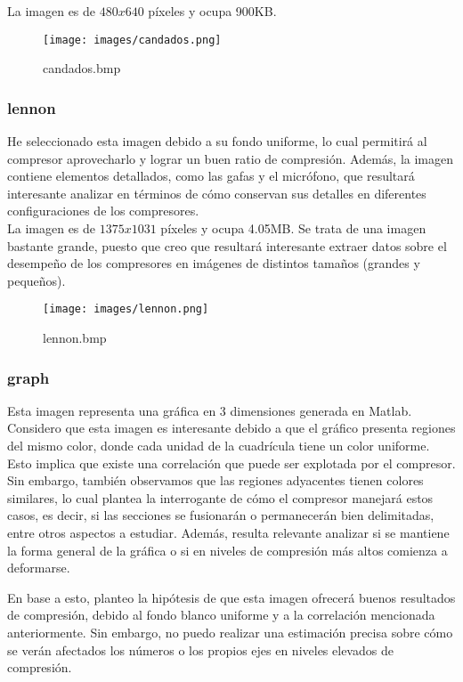\documentclass[12pt,a4paper]{article}
\begin{document}
La imagen es de $480x640$ píxeles y ocupa 900KB.\\

\begin{figure}[H]
    \centering
    \texttt{[image: images/candados.png]}
    \caption{candados.bmp}
    
\end{figure}

\subsubsection{lennon}
He seleccionado esta imagen debido a su fondo uniforme, lo cual permitirá al compresor aprovecharlo y lograr un buen ratio de compresión. Además, la imagen contiene elementos detallados, como las gafas y el micrófono, que resultará interesante analizar en términos de cómo conservan sus detalles en diferentes configuraciones de los compresores.\\

La imagen es de $1375x1031$ píxeles y ocupa 4.05MB. Se trata de una imagen bastante grande, puesto que creo que resultará interesante extraer datos sobre el desempeño de los compresores en imágenes de distintos tamaños (grandes y pequeños).\\

\begin{figure}[H]
    \centering
    \texttt{[image: images/lennon.png]}
    \caption{lennon.bmp}
    
\end{figure}

\subsubsection{graph}
Esta imagen representa una gráfica en 3 dimensiones generada en Matlab. Considero que esta imagen es interesante debido a que el gráfico presenta regiones del mismo color, donde cada unidad de la cuadrícula tiene un color uniforme. Esto implica que existe una correlación que puede ser explotada por el compresor. Sin embargo, también observamos que las regiones adyacentes tienen colores similares, lo cual plantea la interrogante de cómo el compresor manejará estos casos, es decir, si las secciones se fusionarán o permanecerán bien delimitadas, entre otros aspectos a estudiar. Además, resulta relevante analizar si se mantiene la forma general de la gráfica o si en niveles de compresión más altos comienza a deformarse.

En base a esto, planteo la hipótesis de que esta imagen ofrecerá buenos resultados de compresión, debido al fondo blanco uniforme y a la correlación mencionada anteriormente. Sin embargo, no puedo realizar una estimación precisa sobre cómo se verán afectados los números o los propios ejes en niveles elevados de compresión.\\
\end{document}
